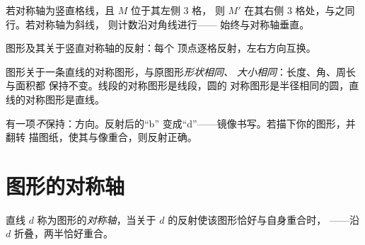 \begin{example}[在方格纸上]\label{ex:g6:symmetry:grid}
若对称轴为竖直格线，且 $M$ 位于其左侧 $3$ 格，
则 $M'$ 在其右侧 $3$ 格处，与之同行。若对称轴为斜线，
则计数沿对角线进行——
始终与对称轴垂直。
\end{example}

\begin{omfigure}

{\small 图形及其关于竖直对称轴的反射：每个
顶点逐格反射，左右方向互换。}
\end{omfigure}

\begin{proposition}[反射保持的性质]\label{prop:g6:symmetry:preserved}
图形关于一条直线的对称图形，与原图形\emph{形状相同、
大小相同}：长度、角、周长与面积都
保持不变。线段的对称图形是线段，圆的
对称图形是半径相同的圆，直线的对称图形是直线。
\end{proposition}
\admitted

\begin{remark}
有一项\emph{不}保持：方向。反射后的“b”
变成“d”——镜像书写。若描下你的图形，并翻转
描图纸，使其与像重合，则反射正确。
\end{remark}

\section{图形的对称轴}

\begin{definition}[对称轴]\label{def:g6:symmetry:axis}
直线 $d$ 称为图形的\emph{对称轴}，当关于
$d$ 的反射使该图形恰好与自身重合时，
——沿 $d$ 折叠，两半恰好重合。
\end{definition}

